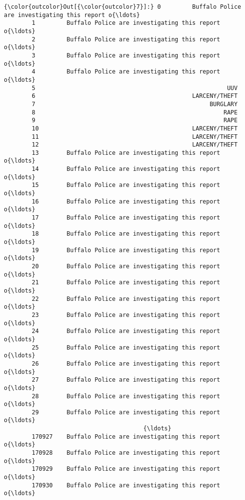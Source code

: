 \documentclass[11pt]{article}
\begin{document}
\begin{Verbatim}[commandchars=\\\{\}]
{\color{outcolor}Out[{\color{outcolor}7}]:} 0         Buffalo Police are investigating this report o{\ldots}
        1         Buffalo Police are investigating this report o{\ldots}
        2         Buffalo Police are investigating this report o{\ldots}
        3         Buffalo Police are investigating this report o{\ldots}
        4         Buffalo Police are investigating this report o{\ldots}
        5                                                       UUV
        6                                             LARCENY/THEFT
        7                                                  BURGLARY
        8                                                      RAPE
        9                                                      RAPE
        10                                            LARCENY/THEFT
        11                                            LARCENY/THEFT
        12                                            LARCENY/THEFT
        13        Buffalo Police are investigating this report o{\ldots}
        14        Buffalo Police are investigating this report o{\ldots}
        15        Buffalo Police are investigating this report o{\ldots}
        16        Buffalo Police are investigating this report o{\ldots}
        17        Buffalo Police are investigating this report o{\ldots}
        18        Buffalo Police are investigating this report o{\ldots}
        19        Buffalo Police are investigating this report o{\ldots}
        20        Buffalo Police are investigating this report o{\ldots}
        21        Buffalo Police are investigating this report o{\ldots}
        22        Buffalo Police are investigating this report o{\ldots}
        23        Buffalo Police are investigating this report o{\ldots}
        24        Buffalo Police are investigating this report o{\ldots}
        25        Buffalo Police are investigating this report o{\ldots}
        26        Buffalo Police are investigating this report o{\ldots}
        27        Buffalo Police are investigating this report o{\ldots}
        28        Buffalo Police are investigating this report o{\ldots}
        29        Buffalo Police are investigating this report o{\ldots}
                                        {\ldots}                        
        170927    Buffalo Police are investigating this report o{\ldots}
        170928    Buffalo Police are investigating this report o{\ldots}
        170929    Buffalo Police are investigating this report o{\ldots}
        170930    Buffalo Police are investigating this report o{\ldots}

\end{Verbatim}
\end{document}

